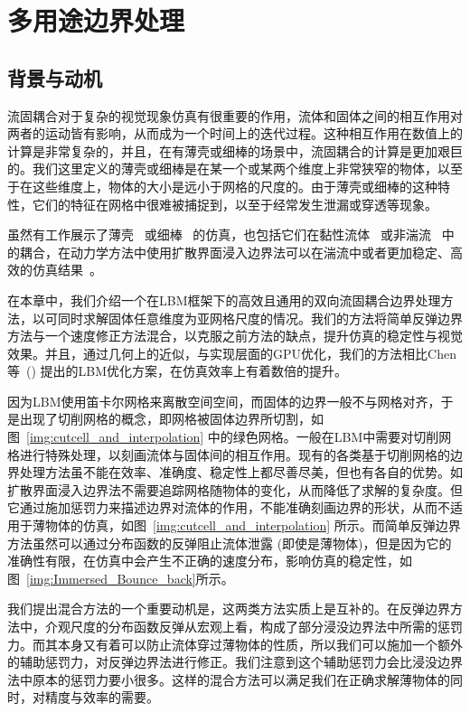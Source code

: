 \chapter{多用途边界处理}
\label{sec:siga21}

\section{背景与动机}
流固耦合对于复杂的视觉现象仿真有很重要的作用，流体和固体之间的相互作用对两者的运动皆有影响，从而成为一个时间上的迭代过程。这种相互作用在数值上的计算是非常复杂的，并且，在有薄壳或细棒的场景中，流固耦合的计算是更加艰巨的。我们这里定义的薄壳或细棒是在某一个或某两个维度上非常狭窄的物体，以至于在这些维度上，物体的大小是远小于网格的尺度的。由于薄壳或细棒的这种特性，它们的特征在网格中很难被捕捉到，以至于经常发生泄漏或穿透等现象。

虽然有工作展示了薄壳~\cite{DiscreteShells,Bridson:2003} 或细棒~\cite{DiscreteRods} 的仿真，也包括它们在黏性流体~\cite{Fei-2018,Takahashi:2019,Fei-2019} 或非湍流~\cite{Azevedo-2016} 中的耦合，在动力学方法中使用扩散界面浸入边界法可以在湍流中或者更加稳定、高效的仿真结果~\cite{Li-2018,Li-2020}。

在本章中，我们介绍一个在LBM框架下的高效且通用的双向流固耦合边界处理方法，以可同时求解固体任意维度为亚网格尺度的情况。我们的方法将简单反弹边界方法与一个速度修正方法混合，以克服之前方法的缺点，提升仿真的稳定性与视觉效果。并且，通过几何上的近似，与实现层面的GPU优化，我们的方法相比Chen等~(\citeyear{Chen-2021}) 提出的LBM优化方案，在仿真效率上有着数倍的提升。

因为LBM使用笛卡尔网格来离散空间空间，而固体的边界一般不与网格对齐，于是出现了切削网格的概念，即网格被固体边界所切割，如图~\ref{img:cutcell_and_interpolation} 中的绿色网格。一般在LBM中需要对切削网格进行特殊处理，以刻画流体与固体间的相互作用。现有的各类基于切削网格的边界处理方法虽不能在效率、准确度、稳定性上都尽善尽美，但也有各自的优势。如扩散界面浸入边界法不需要追踪网格随物体的变化，从而降低了求解的复杂度。但它通过施加惩罚力来描述边界对流体的作用，不能准确刻画边界的形状，从而不适用于薄物体的仿真，如图~\ref{img:cutcell_and_interpolation} 所示。而简单反弹边界方法虽然可以通过分布函数的反弹阻止流体泄露 (即使是薄物体)，但是因为它的准确性有限，在仿真中会产生不正确的速度分布，影响仿真的稳定性，如图~\ref{img:Immersed_Bounce_back}所示。

我们提出混合方法的一个重要动机是，这两类方法实质上是互补的。在反弹边界方法中，介观尺度的分布函数反弹从宏观上看，构成了部分浸没边界法中所需的惩罚力。而其本身又有着可以防止流体穿过薄物体的性质，所以我们可以施加一个额外的辅助惩罚力，对反弹边界法进行修正。我们注意到这个辅助惩罚力会比浸没边界法中原本的惩罚力要小很多。这样的混合方法可以满足我们在正确求解薄物体的同时，对精度与效率的需要。

